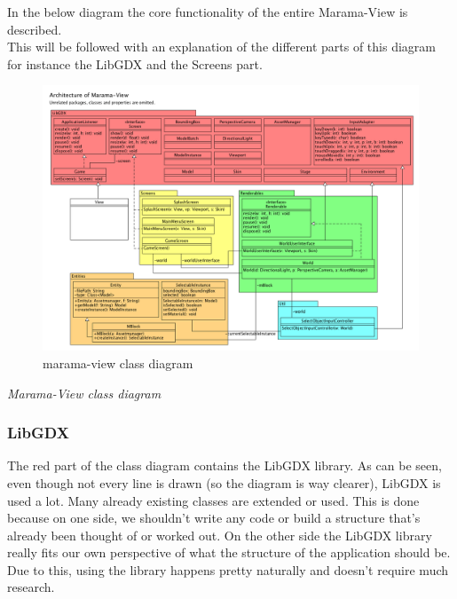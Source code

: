 \documentclass[10pt]{extarticle} %
\begin{document}
    In the below diagram the core functionality of the entire Marama-View is described.\\
    This will be followed with an explanation of the different parts of this diagram for instance the LibGDX and the Screens part. \\
    \begin{figure}[htb]
        \centering
        \includegraphics[width=1\linewidth]{architecture-marama-view.png}
        \caption{marama-view class diagram}
        \label{fig:amv}
    \end{figure}

    \emph{Marama-View class diagram} \\
    \subsubsection[LibGDX]{LibGDX}
    The red part of the class diagram contains the LibGDX library.
    As can be seen, even though not every line is drawn (so the diagram is way clearer), LibGDX is used a lot.
    Many already existing classes are extended or used.
    This is done because on one side, we shouldn't write any code or build a structure that's already been thought of or worked out.
    On the other side the LibGDX library really fits our own perspective of what the structure of the application should be.
    Due to this, using the library happens pretty naturally and doesn't require much research.
\end{document}
